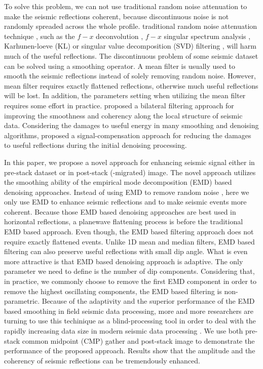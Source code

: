 To solve this problem, we can not use  traditional random noise attenuation  to make the seismic reflections coherent, because discontinuous noise is not randomly spreaded across the whole profile.  traditional random noise attenuation technique \cite[]{wencheng2015asa,yangkang2015}, such as the $f-x$ deconvolution \cite[]{canales1984}, $f-x$ singular spectrum analysis \cite[]{mssa}, Karhunen-loeve (KL) or singular value decomposition (SVD) filtering \cite[]{jones1987}, will harm much of the useful reflections. The discontinuous problem of some seismic dataset can be solved using a smoothing operator. A mean filter is usually used to smooth the seismic reflections instead of solely removing random noise. However, mean filter requires  exactly flattened reflections, otherwise much  useful reflections will be lost. In addition, the parameters setting when utilizing the mean filter requires some effort in practice.  \cite{hale2011} proposed a bilateral filtering approach for improving the smoothness and coherency along the local structure of seismic data. Considering the damages to useful energy in many smoothing and denoising algorithms,  proposed a signal-compensation approach for reducing the damages to useful reflections during the initial denoising processing.

In this paper, we propose a novel approach for enhancing seismic signal either in pre-stack dataset or in post-stack (-migrated) image. The novel approach utilizes the  smoothing ability of the empirical mode decomposition (EMD) based denoising approaches. Instead of using EMD to remove random noise \cite[]{yangkang2014emdsum}, here we only use EMD to enhance seismic reflections and to make seismic events more coherent. Because those EMD based denoising approaches are best used in horizontal reflections, a plane\new{-}wave flattening process is  before the traditional EMD based approach. Even though, the EMD based filtering approach does not require exactly flattened events. Unlike 1D mean and median filters, EMD based filtering can also preserve useful reflections with small dip angle. What is even more attractive is that EMD based denoising approach is  adaptive. The only parameter we need to define is the number of dip components. Considering that, in practice, we commonly choose to remove the first EMD component in order to remove the highest oscillating components, the EMD based filtering is non-parametric. Because of the adaptivity and the superior performance of the EMD based smoothing in field seismic data processing, more and more researchers are turning to use this techinique as a blind-processing tool in order to deal with the rapidly increasing data size in modern seismic data processing . We use both pre-stack common midpoint (CMP) gather and post-stack image to demonstrate the performance of the proposed approach. Results show that the amplitude and the coherency of seismic reflections can be tremendously enhanced.

